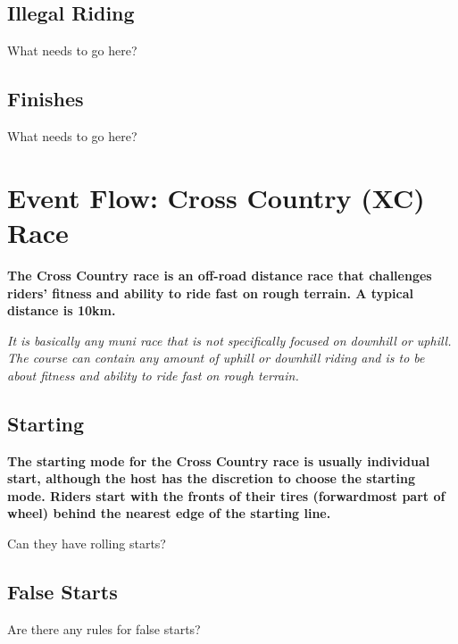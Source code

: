 \subsection{Illegal Riding}

\begin{framed}
What needs to go here?
\end{framed}

\subsection{Finishes}

\begin{framed}
What needs to go here?
\end{framed}

\section{Event Flow: Cross Country (XC) Race\label{sec:muni_xc}}

\textbf{The Cross Country race is an off-road distance race that challenges riders' fitness and ability to ride fast on rough terrain. A typical distance is 10km.}

\textit{It is basically any muni race that is not specifically focused on downhill or uphill. The course can contain any amount of uphill or downhill riding and is to be about fitness and ability to ride fast on rough terrain.}

\subsection{Starting}

\textbf{The starting mode for the Cross Country race is usually individual 
start, although the host has the discretion to choose the starting 
mode. Riders start with the fronts of their tires (forwardmost part of wheel) behind the nearest edge of the starting line.}

\begin{framed}
Can they have rolling starts?
\end{framed}

\subsection{False Starts}

\begin{framed}
Are there any rules for false starts?
\end{framed}

